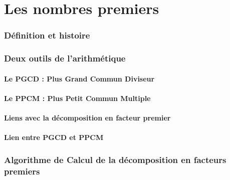 \part{Les nombres premiers}
\setcounter{section}{0}
\section{Définition et histoire}





\section{Deux outils de l'arithmétique}
\subsection{Le PGCD : Plus Grand Commun Diviseur}

\subsection{Le PPCM : Plus Petit Commun Multiple}


\subsection{Liens avec la décomposition en facteur premier}


\subsection{Lien entre PGCD et PPCM}


\section{Algorithme de Calcul de la décomposition en facteurs premiers}
\label{sec:Algorithme}
